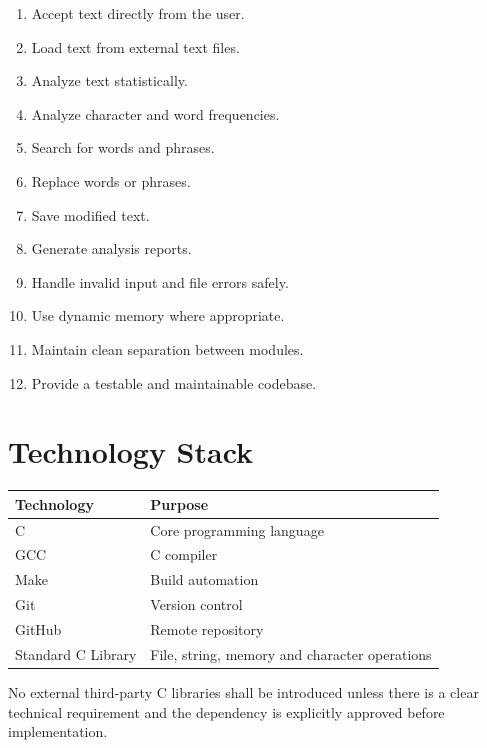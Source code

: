 \documentclass[12pt,a4paper]{article}
\begin{document}
\begin{enumerate}
    \item Accept text directly from the user.
    \item Load text from external text files.
    \item Analyze text statistically.
    \item Analyze character and word frequencies.
    \item Search for words and phrases.
    \item Replace words or phrases.
    \item Save modified text.
    \item Generate analysis reports.
    \item Handle invalid input and file errors safely.
    \item Use dynamic memory where appropriate.
    \item Maintain clean separation between modules.
    \item Provide a testable and maintainable codebase.
\end{enumerate}


\section{Technology Stack}

\begin{longtable}{p{} p{}}
\toprule
\textbf{Technology} & \textbf{Purpose} \\
\midrule
C & Core programming language \\
GCC & C compiler \\
Make & Build automation \\
Git & Version control \\
GitHub & Remote repository \\
Standard C Library & File, string, memory and character operations \\
\bottomrule
\end{longtable}

No external third-party C libraries shall be introduced unless there is
a clear technical requirement and the dependency is explicitly approved
before implementation.

\end{document}
